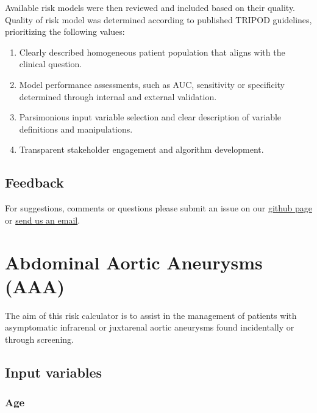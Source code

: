 \documentclass[
]{book}
\providecommand{\tightlist}{%
  \setlength{\itemsep}{0pt}\setlength{\parskip}{0pt}}
\begin{document}
Available risk models were then reviewed and included based on their quality. Quality of risk model was determined according to published TRIPOD guidelines,\citep{collinsTransparentReportingMultivariable2015, moonsTransparentReportingMultivariable2015} prioritizing the following values:

\begin{enumerate}
\def\labelenumi{\arabic{enumi}.}
\tightlist
\item
  Clearly described homogeneous patient population that aligns with the clinical question.
\item
  Model performance assessments, such as AUC, sensitivity or specificity determined through internal and external validation.
\item
  Parsimonious input variable selection and clear description of variable definitions and manipulations.
\item
  Transparent stakeholder engagement and algorithm development.
\end{enumerate}

\hypertarget{feedback}{%
\section{Feedback}\label{feedback}}

For suggestions, comments or questions please submit an issue on our \href{https://github.com/adam-mdmph/vascalc/issues}{github page} or \href{mailto:vascularcalculator@gmail.com}{send us an email}.

\hypertarget{aaa}{%
\chapter{Abdominal Aortic Aneurysms (AAA)}\label{aaa}}

The aim of this risk calculator is to assist in the management of patients with asymptomatic infrarenal or juxtarenal aortic aneurysms found incidentally or through screening.

\hypertarget{input-variables}{%
\section{Input variables}\label{input-variables}}

\hypertarget{age}{%
\subsection{Age}\label{age}}
\end{document}
